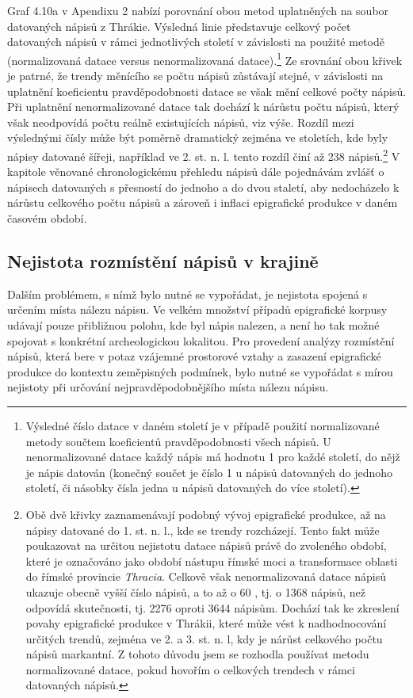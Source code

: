 Graf 4.10a v Apendixu 2 nabízí porovnání obou metod uplatněných na soubor datovaných nápisů z Thrákie. Výsledná linie představuje celkový počet datovaných nápisů v rámci jednotlivých století v závislosti na použité metodě (normalizovaná datace versus nenormalizovaná datace).\footnote{Výsledné číslo datace v daném století je v případě použití normalizované metody součtem koeficientů pravděpodobnosti všech nápisů. U nenormalizované datace každý nápis má hodnotu 1 pro každé století, do nějž je nápis datován (konečný součet je číslo 1 u nápisů datovaných do jednoho století, či násobky čísla jedna u nápisů datovaných do více století).} Ze srovnání obou křivek je patrné, že trendy měnícího se počtu nápisů zůstávají stejné, v závislosti na uplatnění koeficientu pravděpodobnosti datace se však mění celkové počty nápisů. Při uplatnění nenormalizované datace tak dochází k nárůstu počtu nápisů, který však neodpovídá počtu reálně existujících nápisů, viz výše. Rozdíl mezi výslednými čísly může být poměrně dramatický zejména ve stoletích, kde byly nápisy datované šířeji, například ve 2. st. n. l. tento rozdíl činí až 238 nápisů.\footnote{Obě dvě křivky zaznamenávají podobný vývoj epigrafické produkce, až na nápisy datované do 1. st. n. l., kde se trendy rozcházejí. Tento fakt může poukazovat na určitou nejistotu datace nápisů právě do zvoleného období, které je označováno jako období nástupu římské moci a transformace oblasti do římské provincie {\em Thracia}. Celkově však nenormalizovaná datace nápisů ukazuje obecně vyšší číslo nápisů, a to až o 60 , tj. o 1368 nápisů, než odpovídá skutečnosti, tj. 2276 oproti 3644 nápisům. Dochází tak ke zkreslení povahy epigrafické produkce v Thrákii, které může vést k nadhodnocování určitých trendů, zejména ve 2. a 3. st. n. l, kdy je nárůst celkového počtu nápisů markantní. Z tohoto důvodu jsem se rozhodla používat metodu normalizované datace, pokud hovořím o celkových trendech v rámci datovaných nápisů.} V kapitole věnované chronologickému přehledu nápisů dále pojednávám zvlášť o nápisech datovaných s přesností do jednoho a do dvou staletí, aby nedocházelo k nárůstu celkového počtu nápisů a zároveň i inflaci epigrafické produkce v daném časovém období.

\subsection[nejistota-rozmístění-nápisů-v-krajině]{Nejistota rozmístění nápisů v krajině}

Dalším problémem, s nímž bylo nutné se vypořádat, je nejistota spojená s určením místa nálezu nápisu. Ve velkém množství případů epigrafické korpusy udávají pouze přibližnou polohu, kde byl nápis nalezen, a není ho tak možné spojovat s konkrétní archeologickou lokalitou. Pro provedení analýzy rozmístění nápisů, která bere v potaz vzájemné prostorové vztahy a zasazení epigrafické produkce do kontextu zeměpisných podmínek, bylo nutné se vypořádat s mírou nejistoty při určování nejpravděpodobnějšího místa nálezu nápisu.

